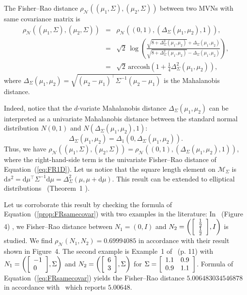 \documentclass[entropy,article,accept,oneauthor,pdftex,entropy]{Definitions/mdpi}
\def\arccosh{\mathrm{arccosh}}
\def\calM{\mathcal{M}}
\def\vectortwo#1#2{{\left[\begin{array}{l}#1 \cr #2\end{array}\right]}}
\def\mattwotwo#1#2#3#4{{\left[\begin{array}{ll}#1 & #2\cr #3 & #4\end{array}\right]}}
\def\calN{\mathcal{N}}
\def\dmu{\mathrm{d}\mu}
\def\ds{\mathrm{d}s}
\begin{document}
\begin{Proposition}\label{prop:FRsamecovar}
The Fisher–Rao distance $\rho_\calN((\mu_1,\Sigma),(\mu_2,\Sigma))$ between two MVNs with same covariance matrix is
\begin{eqnarray}\label{eq:FRsamecovar}
\rho_\calN((\mu_1,\Sigma),(\mu_2,\Sigma)) &=&\rho_\calN((0,1),(\Delta_\Sigma(\mu_1,\mu_2),1)),\\
&=& \sqrt{2}\,\log\left(\frac{\sqrt{8+\Delta_\Sigma^2(\mu_1,\mu_2)}+\Delta_\Sigma(\mu_1,\mu_2)}{\sqrt{8+\Delta_\Sigma^2(\mu_1,\mu_2)}-\Delta_\Sigma(\mu_1,\mu_2)}\right),\\
&=& \sqrt{2}\, \arccosh\left(1+\frac{1}{4}\Delta_\Sigma^2(\mu_1,\mu_2)\right),\label{eq:FRh1dbis}
\end{eqnarray}
where $\Delta_\Sigma(\mu_1,\mu_2)=\sqrt{(\mu_2-\mu_1)^\top\Sigma^{-1}(\mu_2-\mu_1)}$ is the Mahalanobis distance.
\end{Proposition}

Indeed, notice that the $d$-variate Mahalanobis distance $\Delta_\Sigma(\mu_1,\mu_2)$ can be interpreted as a univariate Mahalanobis distance between the standard normal distribution $N(0,1)$ and $N(\Delta_\Sigma(\mu_1,\mu_2),1)$:
$$
\Delta_\Sigma(\mu_1,\mu_2)=\Delta_1(0,\Delta_\Sigma(\mu_1,\mu_2)).
$$
Thus, we have $\rho_\calN((\mu_1,\Sigma),(\mu_2,\Sigma))=\rho_\calN((0,1),(\Delta_\Sigma(\mu_1,\mu_2),1))$,
where the right-hand-side term is the univariate Fisher–Rao distance of Equation~(\ref{eq:FR1D}).
Let us notice that the square length element on $\calM_\Sigma$ is $\ds^2=\dmu^\top\Sigma^{-1}\dmu=\Delta_\Sigma^2(\mu,\mu+\dmu)$.
This result can be extended to elliptical distributions~\cite{chen2021upper} ({Theorem~1}%
).

Let us corroborate this result by checking the formula of Equation~(\ref{prop:FRsamecovar}) with two examples in the literature:
In~\cite{strapasson2015bounds} {(Figure 4)}%
, we Fisher–Rao distance between
$N_1=(0,I)$ and $N_2=\left(\vectortwo{\frac{1}{2}}{\frac{1}{2}},I\right)$ is studied.
We find $\rho_\calN(N_1,N_2)=0.69994085$ in accordance with their result shown in {Figure~4}.
The second example is Example~1 of~\cite{FRMVNReview-2020} (p. 11) with
$N_1=\left(\vectortwo{-1}{0},\Sigma\right)$ and $N_2=\left(\vectortwo{6}{3},\Sigma\right)$ for 
$\Sigma=\mattwotwo{1.1}{0.9}{0.9}{1.1}$.
Formula of Equation~(\ref{eq:FRsamecovar}) yields the Fisher–Rao distance $5.006483034546878$
in accordance with~\cite{FRMVNReview-2020} which reports $5.00648$.
\end{document}
